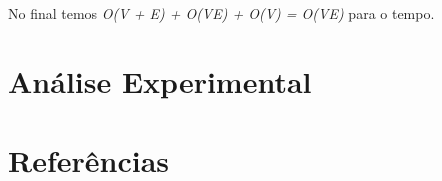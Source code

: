\documentclass[12pt, a4paper]{article}
\begin{document}
\paragraph{}
No final temos \textit{O(V + E) + O(VE) + O(V) = O(VE)} para o tempo.

\section{Análise Experimental}
\paragraph{}

\section{Referências}
\paragraph{}
\end{document}
